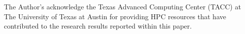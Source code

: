 \documentclass[sigconf]{acmart}
\begin{document}
%





\maketitle










\begin{acks}
The Author's acknowledge the Texas Advanced Computing Center (TACC) at The
University of Texas at Austin for providing HPC resources that have
contributed to the research results reported within this paper.
\end{acks}


 
\end{document}
